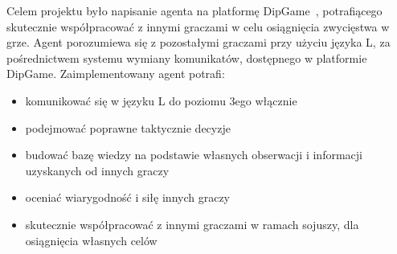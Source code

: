 Celem projektu było napisanie agenta na platformę DipGame~\cite{3718}, potrafiącego skutecznie współpracować z innymi graczami w celu osiągnięcia
zwycięstwa w grze. Agent porozumiewa się z pozostałymi graczami przy użyciu języka L, za pośrednictwem systemu wymiany komunikatów, dostępnego w platformie DipGame. Zaimplementowany agent potrafi:
\begin{itemize}
	\item{komunikować się w języku L do poziomu 3ego włącznie}
	\item{podejmować poprawne taktycznie decyzje}
	\item{budować bazę wiedzy na podstawie własnych obserwacji i informacji uzyskanych od innych graczy}
	\item{oceniać wiarygodność i siłę innych graczy}
	\item{skutecznie współpracować z innymi graczami w ramach sojuszy, dla osiągnięcia własnych celów}
\end{itemize}
